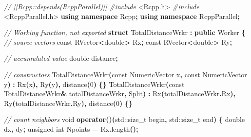 \documentclass[
  12pt,
  american,
  a4paper,
  extrafontsizes,onecolumn,openright
  ]{memoir}
\newenvironment{Shaded}{\begin{snugshade}}{\end{snugshade}}
\newcommand{\AttributeTok}[1]{\textcolor[rgb]{0.77,0.63,0.00}{#1}}
\newcommand{\BuiltInTok}[1]{#1}
\newcommand{\CommentTok}[1]{\textcolor[rgb]{0.56,0.35,0.01}{\textit{#1}}}
\newcommand{\DataTypeTok}[1]{\textcolor[rgb]{0.13,0.29,0.53}{#1}}
\newcommand{\DecValTok}[1]{\textcolor[rgb]{0.00,0.00,0.81}{#1}}
\newcommand{\ImportTok}[1]{#1}
\newcommand{\KeywordTok}[1]{\textcolor[rgb]{0.13,0.29,0.53}{\textbf{#1}}}
\newcommand{\NormalTok}[1]{#1}
\newcommand{\OperatorTok}[1]{\textcolor[rgb]{0.81,0.36,0.00}{\textbf{#1}}}
\newcommand{\PreprocessorTok}[1]{\textcolor[rgb]{0.56,0.35,0.01}{\textit{#1}}}
\begin{document}
\begin{Shaded}
\begin{Highlighting}[]
\CommentTok{// [[Rcpp::depends(RcppParallel)]]}
\PreprocessorTok{\#include }\ImportTok{\textless{}Rcpp.h\textgreater{}}
\PreprocessorTok{\#include }\ImportTok{\textless{}RcppParallel.h\textgreater{}}
\KeywordTok{using} \KeywordTok{namespace}\NormalTok{ Rcpp}\OperatorTok{;}
\KeywordTok{using} \KeywordTok{namespace}\NormalTok{ RcppParallel}\OperatorTok{;}

\CommentTok{// Working function, not exported}
\KeywordTok{struct}\NormalTok{ TotalDistanceWrkr }\OperatorTok{:} \KeywordTok{public}\NormalTok{ Worker}
\OperatorTok{\{}
  \CommentTok{// source vectors}
  \AttributeTok{const}\NormalTok{ RVector}\OperatorTok{\textless{}}\DataTypeTok{double}\OperatorTok{\textgreater{}}\NormalTok{ Rx}\OperatorTok{;}
  \AttributeTok{const}\NormalTok{ RVector}\OperatorTok{\textless{}}\DataTypeTok{double}\OperatorTok{\textgreater{}}\NormalTok{ Ry}\OperatorTok{;}
  
  \CommentTok{// accumulated value}
  \DataTypeTok{double}\NormalTok{ distance}\OperatorTok{;}
   
  \CommentTok{// constructors}
\NormalTok{  TotalDistanceWrkr}\OperatorTok{(}\AttributeTok{const}\NormalTok{ NumericVector x}\OperatorTok{,} \AttributeTok{const}\NormalTok{ NumericVector y}\OperatorTok{)} \OperatorTok{:}
\NormalTok{    Rx}\OperatorTok{(}\NormalTok{x}\OperatorTok{),}\NormalTok{ Ry}\OperatorTok{(}\NormalTok{y}\OperatorTok{),}\NormalTok{ distance}\OperatorTok{(}\DecValTok{0}\OperatorTok{)} \OperatorTok{\{\}}
\NormalTok{  TotalDistanceWrkr}\OperatorTok{(}\AttributeTok{const}\NormalTok{ TotalDistanceWrkr}\OperatorTok{\&}\NormalTok{ totalDistanceWrkr}\OperatorTok{,}\NormalTok{ Split}\OperatorTok{)} \OperatorTok{:}
\NormalTok{    Rx}\OperatorTok{(}\NormalTok{totalDistanceWrkr}\OperatorTok{.}\NormalTok{Rx}\OperatorTok{),}\NormalTok{ Ry}\OperatorTok{(}\NormalTok{totalDistanceWrkr}\OperatorTok{.}\NormalTok{Ry}\OperatorTok{),}\NormalTok{  distance}\OperatorTok{(}\DecValTok{0}\OperatorTok{)} \OperatorTok{\{\}}
  
  \CommentTok{// count neighbors}
  \DataTypeTok{void} \KeywordTok{operator}\OperatorTok{()(}\BuiltInTok{std::}\NormalTok{size\_t}\OperatorTok{ }\NormalTok{begin}\OperatorTok{,} \BuiltInTok{std::}\NormalTok{size\_t}\OperatorTok{ }\NormalTok{end}\OperatorTok{)} \OperatorTok{\{}
    \DataTypeTok{double}\NormalTok{ dx}\OperatorTok{,}\NormalTok{ dy}\OperatorTok{;}
    \DataTypeTok{unsigned} \DataTypeTok{int}\NormalTok{ Npoints }\OperatorTok{=}\NormalTok{ Rx}\OperatorTok{.}\NormalTok{length}\OperatorTok{();}


\end{Highlighting}
\end{Shaded}
\end{document}
